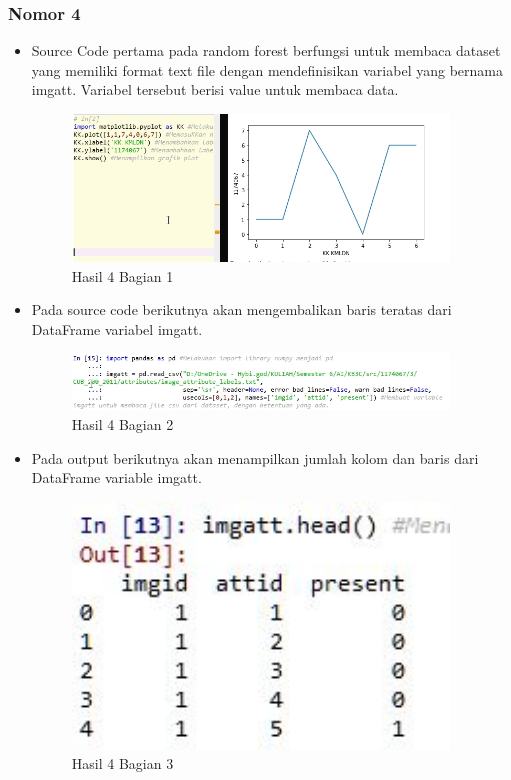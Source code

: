 \subsubsection{Nomor 4}
\hfill\break

\begin{itemize}
\item Source Code pertama pada random forest berfungsi untuk membaca dataset yang memiliki format text file dengan mendefinisikan variabel yang bernama imgatt. Variabel tersebut berisi value untuk membaca data.

\begin{figure}[H]
\centerline{\includegraphics[width=10cm]{figures/1174067/3/6.jpg}}
\caption{Hasil 4 Bagian 1}
\label{labelgambar}
\end{figure}

\item Pada source code berikutnya akan mengembalikan baris teratas dari DataFrame variabel imgatt.

\begin{figure}[H]
\centerline{\includegraphics[width=10cm]{figures/1174067/3/7.jpg}}
\caption{Hasil 4 Bagian 2}
\label{labelgambar}
\end{figure}

\item Pada output berikutnya akan menampilkan jumlah kolom dan baris dari DataFrame variable imgatt.

\begin{figure}[H]
\centerline{\includegraphics[width=10cm]{figures/1174067/3/8.jpg}}
\caption{Hasil 4 Bagian 3}
\label{labelgambar}
\end{figure}


\end{itemize}
